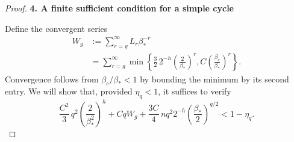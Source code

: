 \documentclass[11pt,a4paper]{article}
\newcommand{\proofstep}[1]{%
  \par\addvspace{1.0\baselineskip}%
  \noindent\textbf{#1}\par\nobreak\smallskip\noindent\ignorespaces}
\begin{document}
\begin{proof}
\proofstep{4. A finite sufficient condition for a simple cycle}
Define the convergent series
\begin{equation}\label{eq:W}
 \begin{split}
 W_g
 &:=\sum_{r=g}^{\infty}L_r\beta_*^{-r}\\
 &=\sum_{r=g}^{\infty}
 \min\!\left\{
 \frac32\,2^{-h}\left(\frac2{\beta_*}\right)^r,
 C\left(\frac{\beta_c}{\beta_*}\right)^r
 \right\}.
 \end{split}
\end{equation}
Convergence follows from $\beta_c/\beta_*<1$ by bounding the minimum by
its second entry. We will show that, provided $\eta_q<1$, it suffices to
verify
\begin{equation}\label{eq:certificate}
 \frac{C^2}{3}\,q^2\left(\frac2{\beta_*^2}\right)^h
 +CqW_g
 +\frac{3C}{4}\,nq^2 2^{-h}
       \left(\frac{\beta_*}{2}\right)^{q/2}
 <1-\eta_q.
\end{equation}


\end{proof}
\end{document}
